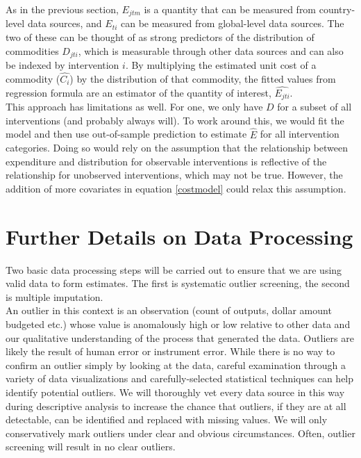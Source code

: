 \documentclass[twocolumn]{bmcart}%
\begin{document}
As in the previous section, $E_{jtm}$ is a quantity that can be measured from country-level data sources, and $E_{ti}$ can be measured from global-level data sources. The two of these can be thought of as strong predictors of the distribution of commodities $D_{jti}$, which is measurable through other data sources and can also be indexed by intervention $i$. By multiplying the estimated unit cost of a commodity ($\widehat{C_i}$) by the distribution of that commodity, the fitted values from regression formula are an estimator of the quantity of interest, $\widehat{E_{jti}}$. \\

This approach has limitations as well. For one, we only have $D$ for a subset of all interventions (and probably always will). To work around this, we would fit the model and then use out-of-sample prediction to estimate $\hat{E}$ for all intervention categories. Doing so would rely on the assumption that the relationship between expenditure and distribution for observable interventions is reflective of the relationship for unobserved interventions, which may not be true. However, the addition of more covariates in equation \ref{costmodel} could relax this assumption.

\section{Further Details on Data Processing} \label{data_processing}

Two basic data processing steps will be carried out to ensure that we are using valid data to form estimates. The first is systematic outlier screening, the second is multiple imputation. \\

An outlier in this context is an observation (count of outputs, dollar amount budgeted etc.) whose value is anomalously high or low relative to other data and our qualitative understanding of the process that generated the data. Outliers are likely the result of human error or instrument error. While there is no way to confirm an outlier simply by looking at the data, careful examination through a variety of data visualizations and carefully-selected statistical techniques can help identify potential outliers. We will thoroughly vet every data source in this way during descriptive analysis to increase the chance that outliers, if they are at all detectable, can be identified and replaced with missing values. We will only conservatively mark outliers under clear and obvious circumstances. Often, outlier screening will result in no clear outliers. \\
\end{document}
